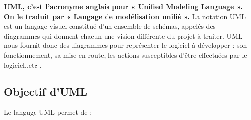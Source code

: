 \documentclass[french,a4,12pt]{report}
\begin{document}
  \textbf{UML, c’est l’acronyme anglais pour « Unified Modeling Language ». On le traduit par « Langage de modélisation unifié ».}
La notation UML est un langage visuel constitué d’un ensemble de schémas, appelés des diagrammes qui donnent chacun une vision différente du projet à traiter. UML nous fournit donc des diagrammes pour représenter le logiciel à développer : son fonctionnement, sa mise en route, les actions susceptibles d’être effectuées par le logiciel..etc \cite{7}.
\newpage
\begin{tcolorbox}[colframe=green!75,rightrule=0.5cm,leftrule=0.5cm,]
\subsection{Objectif d'UML}
\end{tcolorbox}
Le languge UML permet de :
\end{document}
